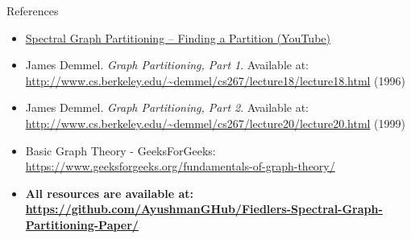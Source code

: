 \documentclass[aspectratio=169]{beamer}
\begin{document}
\begin{frame}{References}
    \begin{itemize}
        \item \href{https://www.youtube.com/watch?v=siCPjpUtE0A&t=1s}{Spectral Graph Partitioning – Finding a Partition (YouTube)}
        \item James Demmel. \textit{Graph Partitioning, Part 1}. Available at: \\
        \url{http://www.cs.berkeley.edu/~demmel/cs267/lecture18/lecture18.html} (1996)
        \item James Demmel. \textit{Graph Partitioning, Part 2}. Available at: \\
        \url{http://www.cs.berkeley.edu/~demmel/cs267/lecture20/lecture20.html} (1999)
        \item Basic Graph Theory - GeeksForGeeks: \\
        \url{https://www.geeksforgeeks.org/fundamentals-of-graph-theory/}
        \item \textbf{All resources are available at: \url{https://github.com/AyushmanGHub/Fiedlers-Spectral-Graph-Partitioning-Paper/}}
    \end{itemize}
\end{frame}
\end{document}
